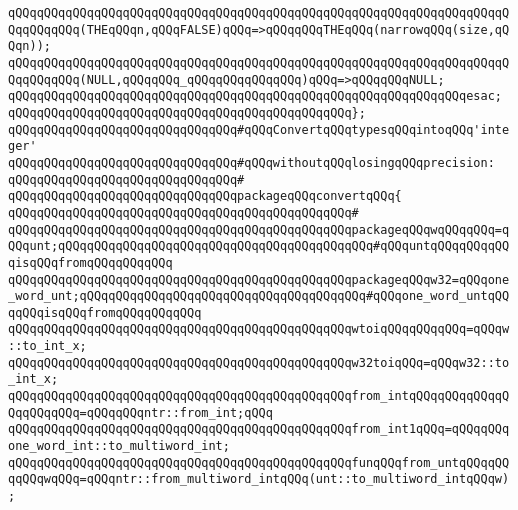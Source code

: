 \verb|qQQqqQQqqQQqqQQqqQQqqQQqqQQqqQQqqQQqqQQqqQQqqQQqqQQqqQQqqQQqqQQqqQQqqQQqqQQqqQQq(THEqQQqn,qQQqFALSE)qQQq=>qQQqqQQqTHEqQQq(narrowqQQq(size,qQQqn));|\newline
\verb|qQQqqQQqqQQqqQQqqQQqqQQqqQQqqQQqqQQqqQQqqQQqqQQqqQQqqQQqqQQqqQQqqQQqqQQqqQQqqQQq(NULL,qQQqqQQq_qQQqqQQqqQQqqQQq)qQQq=>qQQqqQQqNULL;|\newline
\verb|qQQqqQQqqQQqqQQqqQQqqQQqqQQqqQQqqQQqqQQqqQQqqQQqqQQqqQQqqQQqqQQqesac;|\newline
\verb|qQQqqQQqqQQqqQQqqQQqqQQqqQQqqQQqqQQqqQQqqQQqqQQq};|\newline
\newline
\verb|qQQqqQQqqQQqqQQqqQQqqQQqqQQqqQQq#qQQqConvertqQQqtypesqQQqintoqQQq'integer'|\newline
\verb|qQQqqQQqqQQqqQQqqQQqqQQqqQQqqQQq#qQQqwithoutqQQqlosingqQQqprecision:|\newline
\verb|qQQqqQQqqQQqqQQqqQQqqQQqqQQqqQQq#|\newline
\verb|qQQqqQQqqQQqqQQqqQQqqQQqqQQqqQQqpackageqQQqconvertqQQq{|\newline
\verb|qQQqqQQqqQQqqQQqqQQqqQQqqQQqqQQqqQQqqQQqqQQqqQQq#|\newline
\verb|qQQqqQQqqQQqqQQqqQQqqQQqqQQqqQQqqQQqqQQqqQQqqQQqpackageqQQqwqQQqqQQq=qQQqunt;qQQqqQQqqQQqqQQqqQQqqQQqqQQqqQQqqQQqqQQqqQQq#qQQquntqQQqqQQqqQQqisqQQqfromqQQqqQQqqQQq|\newline
\verb|qQQqqQQqqQQqqQQqqQQqqQQqqQQqqQQqqQQqqQQqqQQqqQQqpackageqQQqw32=qQQqone_word_unt;qQQqqQQqqQQqqQQqqQQqqQQqqQQqqQQqqQQqqQQq#qQQqone_word_untqQQqqQQqisqQQqfromqQQqqQQqqQQq|\newline
\newline
\verb|qQQqqQQqqQQqqQQqqQQqqQQqqQQqqQQqqQQqqQQqqQQqqQQqwtoiqQQqqQQqqQQq=qQQqw::to_int_x;|\newline
\verb|qQQqqQQqqQQqqQQqqQQqqQQqqQQqqQQqqQQqqQQqqQQqqQQqw32toiqQQq=qQQqw32::to_int_x;|\newline
\newline
\verb|qQQqqQQqqQQqqQQqqQQqqQQqqQQqqQQqqQQqqQQqqQQqqQQqfrom_intqQQqqQQqqQQqqQQqqQQqqQQq=qQQqqQQqntr::from_int;qQQq|\newline
\newline
\verb|qQQqqQQqqQQqqQQqqQQqqQQqqQQqqQQqqQQqqQQqqQQqqQQqfrom_int1qQQq=qQQqqQQqone_word_int::to_multiword_int;|\newline
\newline
\verb|qQQqqQQqqQQqqQQqqQQqqQQqqQQqqQQqqQQqqQQqqQQqqQQqfunqQQqfrom_untqQQqqQQqqQQqwqQQq=qQQqntr::from_multiword_intqQQq(unt::to_multiword_intqQQqw);|\newline
